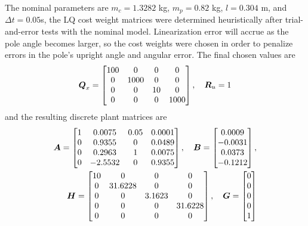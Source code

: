 The nominal parameters are $m_{c} = 1.3282$ kg, $m_{p} = 0.82$ kg, $l = 0.304$ m, and $\Delta t = 0.05$s, the LQ cost weight matrices were determined heuristically after trial-and-error tests with the nominal model.  Linearization error will accrue as the pole angle becomes larger, so the cost weights were chosen in order to penalize errors in the pole's upright angle and angular error.  The final chosen values are
\begin{equation*}
\begin{aligned}
    \vb*{Q}_{x} = \begin{bmatrix}
        100 & 0 & 0 & 0\\
        0 & 1000 & 0 & 0\\
        0 & 0 & 10 & 0\\
        0 & 0 & 0 & 1000\\
        \end{bmatrix}, \hspace{10pt}
    \vb*{R}_{u} = 1
\end{aligned}
\end{equation*}
and the resulting discrete plant matrices are
\begin{equation*}
\begin{aligned}
    \vb*{A} = \begin{bmatrix}
        1 & 0.0075 & 0.05 & 0.0001\\
        0 & 0.9355 & 0 & 0.0489\\
        0 & 0.2963 & 1 & 0.0075\\
        0 & -2.5532 & 0 & 0.9355\\
    \end{bmatrix},\hspace{10pt}
    \vb*{B} = \begin{bmatrix}
        0.0009\\
        -0.0031\\
        0.0373\\
        -0.1212\\
    \end{bmatrix},\\%
    \vb*{H} = \begin{bmatrix}
        10 & 0 & 0 & 0\\
        0 & 31.6228 & 0 & 0\\
        0 & 0 & 3.1623 & 0\\
        0 & 0 & 0 & 31.6228\\
        0 & 0 & 0 & 0\\
    \end{bmatrix},\hspace{10pt}
    \vb*{G} = \begin{bmatrix}
        0\\
        0\\
        0\\
        0\\
        1\\
    \end{bmatrix}
\end{aligned}
\end{equation*}

